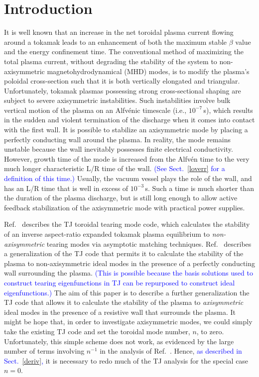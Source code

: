 \documentclass[12pt,prb,aps]{revtex4-1}
\begin{document}
\section{Introduction}
It is well known that an increase in  the net toroidal plasma current flowing around a tokamak  leads to an enhancement of both the maximum stable $\beta$ value and the energy confinement time.\cite{troyon,goldston}
The conventional method of maximizing the total plasma current, without degrading the  stability of the system to non-axisymmetric magnetohydrodynamical (MHD) modes, is
to modify the plasma's poloidal cross-section such that it is both vertically elongated and triangular.\cite{jet}  Unfortunately, tokamak plasmas possessing strong cross-sectional shaping
are subject to severe axisymmetric instabilities.\cite{v1,v2} Such instabilities involve bulk vertical motion of the plasma on an Alfv\'{e}nic timescale (i.e., $10^{-7}$\,s), which results in the
sudden and violent termination of the  discharge when it comes into contact with the first wall. It is possible to stabilize an axisymmetric mode by placing a perfectly conducting wall
around the plasma. In reality, the mode remains unstable because  the wall inevitably possesses finite electrical conductivity.\cite{rwm}  However, 
growth time of the mode is increased from the Alfv\'{e}n time to the very much longer characteristic L/R time of the wall.\cite{rwm1,rwm1a,rwm2}
\textcolor{blue}{(See Sect.~\ref{loverr} for a definition of this time.)}
Usually, the vacuum vessel plays the role of the wall,
and has an L/R time that is  well in excess of  $10^{-3}$\,s. Such a time is much shorter than the duration of the plasma 
discharge, but is still long enough to allow active feedback stabilization of the axisymmetric mode with practical power supplies.\cite{rwm3} 

Ref.~ describes the TJ toroidal tearing mode code, which calculates the stability of an inverse aspect-ratio expanded  tokamak plasma equilibrium  to {\em non-axisymmetric}\/ tearing modes via
asymptotic matching techniques. Ref.~ describes a generalization of the TJ code that permits it to calculate the stability of the plasma to non-axisymmetric
ideal modes in the presence of a perfectly conducting wall surrounding the plasma. \textcolor{blue}{(This is possible because the basis solutions used to construct
tearing eigenfunctions in TJ can be repurposed to construct ideal eigenfunctions.)} The aim of this paper is to describe a further generalization the TJ code that  allows it to calculate
the stability of the plasma to {\em axisymmetric}\/ ideal modes in the presence of a resistive wall that surrounds the plasma. It might be hope that, in order to investigate axisymmetric
modes,  we could simply take the existing
TJ code and set the toroidal mode number, $n$, to zero. Unfortunately, this simple scheme does not work, as evidenced by the large number of terms involving
$n^{-1}$ in the analysis of Ref.~. Hence, \textcolor{blue}{as described in Sect.~\ref{deriv},} it is necessary to redo  much of the TJ analysis for the special case $n=0$. 
\end{document}
